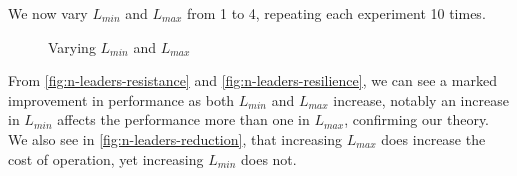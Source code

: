 We now vary $L_{min}$ and $L_{max}$ from 1 to 4, repeating each experiment 10 times.
\begin{figure}[!h]
	\centering
	\caption{Varying $L_{min}$ and $L_{max}$}
\end{figure}

From \autoref{fig:n-leaders-resistance} and \autoref{fig:n-leaders-resilience}, we can see a marked improvement in performance as both $L_{min}$ and $L_{max}$ increase, notably an increase in $L_{min}$ affects the performance more than one in $L_{max}$, confirming our theory. We also see in \autoref{fig:n-leaders-reduction}, that increasing $L_{max}$ does increase the cost of operation, yet increasing $L_{min}$ does not.